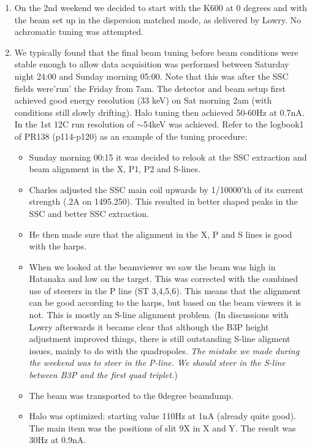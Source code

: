 \documentclass[11pt]{report}
\begin{document}
\begin{enumerate}
\item On the 2nd weekend we decided to start with the K600 at 0 degrees and with the beam set up
  in the dispersion matched mode, as delivered by Lowry. No achromatic tuning was attempted.
\item We typically found that 
the final beam tuning before beam conditions were stable enough to allow data acquisition
was performed between Saturday night 24:00 and Sunday morning 05:00. 
Note that this was after the SSC fields were'run' the Friday from 7am.  
The detector and beam setup first achieved good energy resolution (33 keV) on Sat morning 2am (with conditions 
still slowly drifting).
Halo tuning then achieved 50-60Hz at 0.7nA. In the 1st 12C run resolution of $\sim$54keV was achieved.
Refer to the logbook1 of PR138 (p114-p120) as an example of the tuning procedure:
  \begin{itemize}
  \item Sunday morning 00:15 it was decided to relook at the SSC extraction and beam alignment in the X, P1, P2 and S-lines.
  \item Charles adjusted the SSC main coil upwards by 1/10000'th of its current strength (.2A on 1495.250). 
  This resulted in better shaped peaks in the SSC and better SSC extraction. 
  \item He then made sure that the alignment in the X, P and S lines is good with the harps. 
  \item When we looked at the beamviewer we saw the beam was high in Hatanaka and low on the target. This was corrected
  with the combined use of steerers in the P line (ST 3,4,5,6).
  This means that the alignment can be good according to the harps, but based on the beam viewers it is not.
  This is mostly an S-line alignment problem. 
 (In discussions with Lowry afterwards it became clear that although the B3P height adjustment improved things, there
  is still outstanding S-line aligment issues, mainly to do with the quadropoles.
  {\it The mistake we made during the weekend was to steer in the P-line. We should steer in the S-line between 
       B3P and the first quad triplet.})
  \item The beam was transported to the 0degree beamdump.
  \item Halo was optimized: starting value 110Hz at 1nA  (already quite good).
  The main item was the positions of slit 9X in X and Y. The result was 30Hz at 0.9nA.

\end{itemize}
\end{enumerate}
\end{document}
